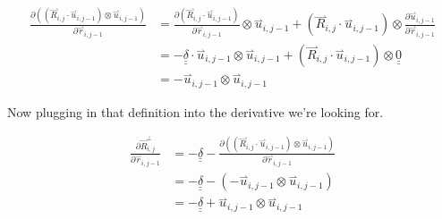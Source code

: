 \documentclass{article}
\renewcommand{\ij}{_{i,j}}
\newcommand{\ijj}{_{i,j-1}}
\newcommand{\ijjj}{_{i,j-2}}
\newcommand{\magn}[1]{\left\vert #1 \right\vert }
\renewcommand{\part}[2]{\frac{\partial #1 }{\partial #2}}
\newcommand{\harp}{\overset{\rightharpoonup}}
\newcommand{\ten}[1]{\underline{\underline{#1}}}
\newcommand{\rij}{\harp r \ij}
\newcommand{\Rij}{\harp R \ij}
\newcommand{\rijj}{\harp r \ijj}
\newcommand{\rijjj}{\harp r \ijjj}
\newcommand{\uijj}{\harp u \ijj}
\begin{document}
\begin{align*}
  \part{\left(\left(\harp R\ij \cdot \harp u \ijj \right) \otimes 
  \harp u \ijj \right)
  }{\harp r\ijj}
  &= 
  \part{\left(\harp R\ij \cdot \harp u \ijj \right)}{\harp r\ijj} \otimes
  \uijj 
  +
  \left(\harp R\ij \cdot \harp u \ijj \right) \otimes
  \part{\uijj }{\harp r\ijj} 
  \\
  &= 
  - \ten{\delta} \cdot \uijj 
  \otimes \uijj 
  + \left(\Rij \cdot \uijj \right) \otimes \ten{0}
  \\
  &= 
  - \uijj \otimes \uijj
\end{align*}

Now plugging in that definition into the derivative we're looking for.

\begin{align*}
  \part{\harp R\ij ^ \bot}{\harp r\ijj}  &= - \ten{\delta} 
  - \part{\left(\left(\harp R\ij \cdot \uijj \right) \otimes 
  \harp u \ijj \right)
  }{\harp r\ijj} 
  \\
  &= -
  \ten{\delta}
  -
  \left( - \uijj \otimes \uijj \right)
  \\
  &= 
  -
  \ten{\delta} + 
  \uijj \otimes \uijj 
\end{align*}
\end{document}

